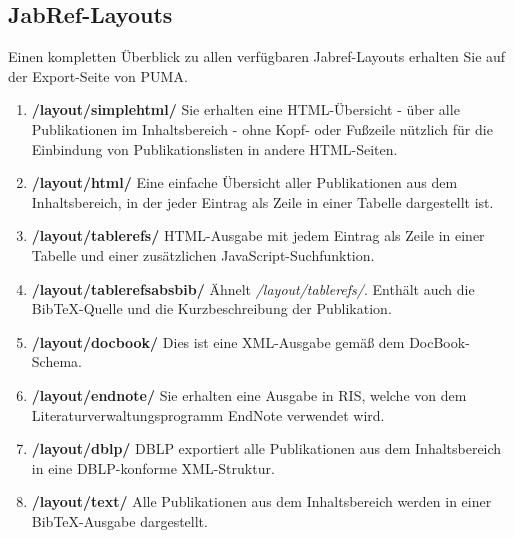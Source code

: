 \subsection{JabRef-Layouts}
Einen kompletten Überblick zu allen verfügbaren Jabref-Layouts erhalten Sie auf der Export-Seite von PUMA.
\begin{enumerate}
	\item  \textbf{/layout/simplehtml/}\newline
	Sie erhalten eine HTML-Übersicht - über alle Publikationen im 		Inhaltsbereich - ohne Kopf- oder Fußzeile nützlich für die 			Einbindung von Publikationslisten in andere HTML-Seiten.
	\item \textbf{/layout/html/}\newline
    Eine einfache Übersicht aller Publikationen aus dem Inhaltsbereich, in der jeder Eintrag als Zeile in einer Tabelle dargestellt ist.
	\item \textbf{/layout/tablerefs/} \newline
    HTML-Ausgabe mit jedem Eintrag als Zeile in einer Tabelle und einer zusätzlichen JavaScript-Suchfunktion.
\item \textbf{/layout/tablerefsabsbib/} \newline
    Ähnelt \textit{/layout/tablerefs/}. Enthält auch die BibTeX-Quelle und die Kurzbeschreibung der Publikation.
\item \textbf{/layout/docbook/} \newline
    Dies ist eine XML-Ausgabe gemäß dem DocBook-Schema.
\item \textbf{/layout/endnote/} \newline
    Sie erhalten eine Ausgabe in RIS, welche von dem Literaturverwaltungsprogramm EndNote verwendet wird.
\item \textbf{/layout/dblp/} \newline
    DBLP exportiert alle Publikationen aus dem Inhaltsbereich in eine DBLP-konforme XML-Struktur. 
\item \textbf{/layout/text/}\newline
    Alle Publikationen aus dem Inhaltsbereich werden in einer BibTeX-Ausgabe dargestellt.
\end{enumerate}


